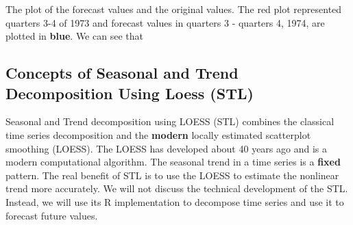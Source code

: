\documentclass[
]{book}
\newenvironment{Shaded}{\begin{snugshade}}{\end{snugshade}}
\newcommand{\AttributeTok}[1]{\textcolor[rgb]{0.13,0.29,0.53}{#1}}
\newcommand{\DecValTok}[1]{\textcolor[rgb]{0.00,0.00,0.81}{#1}}
\newcommand{\DocumentationTok}[1]{\textcolor[rgb]{0.56,0.35,0.01}{\textbf{\textit{#1}}}}
\newcommand{\FunctionTok}[1]{\textcolor[rgb]{0.13,0.29,0.53}{\textbf{#1}}}
\newcommand{\NormalTok}[1]{#1}
\newcommand{\OtherTok}[1]{\textcolor[rgb]{0.56,0.35,0.01}{#1}}
\newcommand{\SpecialCharTok}[1]{\textcolor[rgb]{0.81,0.36,0.00}{\textbf{#1}}}
\newcommand{\StringTok}[1]{\textcolor[rgb]{0.31,0.60,0.02}{#1}}
\begin{document}
The plot of the forecast values and the original values. The red plot represented quarters 3-4 of 1973 and forecast values in quarters 3 - quarters 4, 1974, are plotted in \textbf{blue}. We can see that

\hypertarget{concepts-of-seasonal-and-trend-decomposition-using-loess-stl}{%
\subsection{Concepts of Seasonal and Trend Decomposition Using Loess (STL)}\label{concepts-of-seasonal-and-trend-decomposition-using-loess-stl}}

Seasonal and Trend decomposition using LOESS (STL) combines the classical time series decomposition and the \textbf{modern} locally estimated scatterplot smoothing (LOESS). The LOESS has developed about 40 years ago and is a modern computational algorithm. The seasonal trend in a time series is a \textbf{fixed} pattern. The real benefit of STL is to use the LOESS to estimate the nonlinear trend more accurately. We will not discuss the technical development of the STL. Instead, we will use its R implementation to decompose time series and use it to forecast future values.

\begin{Shaded}
\end{Shaded}
\end{document}
